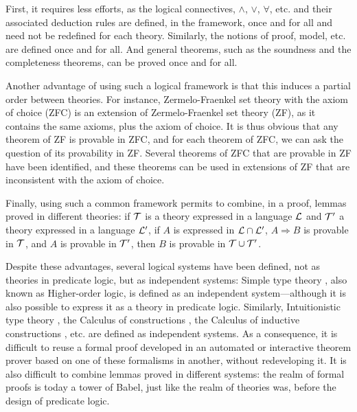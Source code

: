 \documentclass[english]{lipics}
\newcommand\fa{\forall}
\newcommand\T{{\cal T}}
\begin{document}
First, it requires less efforts, as the logical connectives, $\wedge$,
$\vee$, $\fa$, etc. and their associated deduction rules are defined,
in the framework, once and for all and need not be redefined for each
theory. Similarly, the notions of proof, model, etc. are defined once and
for all. And general theorems, such as the soundness and the
completeness theorems, can be proved once and for all.

Another advantage of using such a logical framework is that this
induces a partial order between theories. For instance,
Zermelo-Fraenkel set theory with the axiom of choice (ZFC) is an
extension of Zermelo-Fraenkel set theory (ZF), as it contains the same
axioms, plus the axiom of choice. It is thus obvious that any theorem
of ZF is provable in ZFC, and for each theorem of ZFC, we can ask the
question of its provability in ZF. Several theorems of ZFC that are
provable in ZF have been identified, and these theorems can be used
in extensions of ZF that are inconsistent with the axiom of choice.

Finally, using such a common framework permits to combine, in a proof,
lemmas proved in different theories: if $\T$ is a theory expressed in
a language ${\cal L}$ and $\T'$ a theory expressed in a language
${\cal L}'$, if $A$ is expressed in ${\cal L} \cap {\cal L}'$, $A
\Rightarrow B$ is provable in $\T$, and $A$ is provable in $\T'$, then
$B$ is provable in $\T \cup \T'$.

Despite these advantages, several logical systems have been defined,
not as theories in predicate logic, but as independent systems: Simple
type theory \cite{Church40,Andrews86}, also known as Higher-order
logic, is defined as an independent system---although it is also
possible to express it as a theory in predicate logic. Similarly,
Intuitionistic type theory \cite{MartinLof}, the Calculus of
constructions \cite{CoquandHuet}, the Calculus of inductive
constructions \cite{Paulin-Mohring}, etc. are defined as independent
systems.  As a consequence, it is difficult to reuse a formal proof
developed in an automated or interactive theorem prover based on one
of these formalisms in another, without redeveloping it. It is also
difficult to combine lemmas proved in different systems: the realm of
formal proofs is today a tower of Babel, just like the realm of
theories was, before the design of predicate logic.
\end{document}
